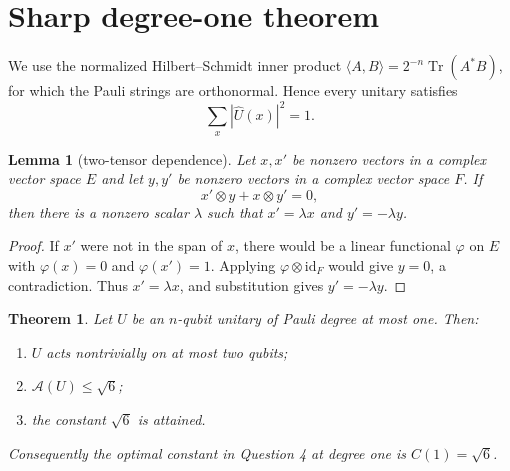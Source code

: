 \documentclass[11pt]{article}
\newtheorem{theorem}{Theorem}
\newtheorem{lemma}{Lemma}
\newcommand{\Tr}{\operatorname{Tr}}
\newcommand{\A}{\mathcal A}
\begin{document}
\section{Sharp degree-one theorem}

We use the normalized Hilbert--Schmidt inner product
$\langle A,B\rangle=2^{-n}\Tr(A^*B)$, for which the Pauli strings are
orthonormal.  Hence every unitary satisfies
\begin{equation}\label{eq:parseval}
 \sum_x|\widehat U(x)|^2=1.
\end{equation}

\begin{lemma}[two-tensor dependence]\label{lem:tensor}
Let $x,x'$ be nonzero vectors in a complex vector space $E$ and let $y,y'$ be
nonzero vectors in a complex vector space $F$.  If
\[
 x'\otimes y+x\otimes y'=0,
\]
then there is a nonzero scalar $\lambda$ such that
$x'=\lambda x$ and $y'=-\lambda y$.
\end{lemma}

\begin{proof}
If $x'$ were not in the span of $x$, there would be a linear functional
$\varphi$ on $E$ with $\varphi(x)=0$ and $\varphi(x')=1$.  Applying
$\varphi\otimes\mathrm{id}_F$ would give $y=0$, a contradiction.  Thus
$x'=\lambda x$, and substitution gives $y'=-\lambda y$.
\end{proof}

\begin{theorem}\label{thm:main}
Let $U$ be an $n$-qubit unitary of Pauli degree at most one.  Then:
\begin{enumerate}
\item $U$ acts nontrivially on at most two qubits;
\item $\A(U)\le\sqrt6$;
\item the constant $\sqrt6$ is attained.
\end{enumerate}
Consequently the optimal constant in Question 4 at degree one is
$C(1)=\sqrt6$.
\end{theorem}
\end{document}
